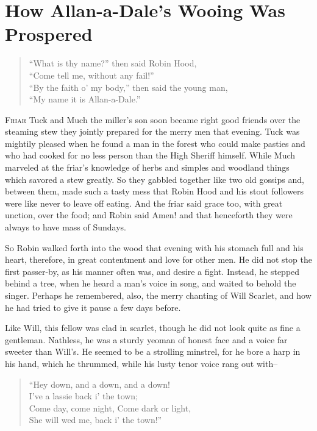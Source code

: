 \chapter{How Allan-a-Dale’s Wooing Was Prospered}

\begin{quote}
“What is thy name?” then said Robin Hood,\\
“Come tell me, without any fail!”\\
“By the faith o’ my body,” then said the young man,\\
“My name it is Allan-a-Dale.”
\end{quote}

\lettrine{F}{riar} Tuck and Much the miller's son soon became right good
friends over the steaming stew they jointly prepared for the merry men
that evening. Tuck was mightily pleased when he found a man in the forest
who could make pasties and who had cooked for no less person than the
High Sheriff himself. While Much marveled at the friar's knowledge of
herbs and simples and woodland things which savored a stew greatly. So
they gabbled together like two old gossips and, between them, made such a
tasty mess that Robin Hood and his stout followers were like never to
leave off eating. And the friar said grace too, with great unction, over
the food; and Robin said Amen! and that henceforth they were always to
have mass of Sundays.

So Robin walked forth into the wood that evening with his stomach full
and his heart, therefore, in great contentment and love for other men.
He did not stop the first passer-by, as his manner often was, and desire
a fight. Instead, he stepped behind a tree, when he heard a man's voice
in song, and waited to behold the singer. Perhaps he remembered, also,
the merry chanting of Will Scarlet, and how he had tried to give it
pause a few days before.

Like Will, this fellow was clad in scarlet, though he did not look quite
as fine a gentleman. Nathless, he was a sturdy yeoman of honest face and
a voice far sweeter than Will's. He seemed to be a strolling minstrel,
for he bore a harp in his hand, which he thrummed, while his lusty tenor
voice rang out with--

\begin{quote}
“Hey down, and a down, and a down!\\
I’ve a lassie back i’ the town;\\
Come day, come night, Come dark or light,\\
She will wed me, back i’ the town!”
\end{quote}

